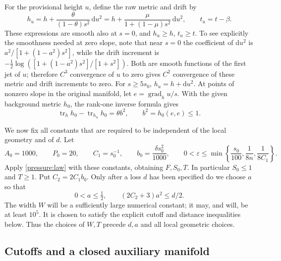\documentclass[11pt]{article}
\numberwithin{equation}{section}
\theoremstyle{definition}
\theoremstyle{remark}
\begin{document}
For the provisional height $u$, define the raw metric and drift by
\begin{equation}\label{step:raw-output}
 h_u=h+\frac{\theta}{(1-\theta)s^2}\,\mathrm d u^2
     =h+\frac{\mu}{1+(1-\mu)s^2}\,\mathrm d u^2,
 \qquad t_u=t-\beta.
\end{equation}
These expressions are smooth also at $s=0$, and $h_u\ge h$, $t_u\ge t$.
To see explicitly the smoothness needed at zero slope, note that near $s=0$
the coefficient of $\mathrm d u^2$ is
$a^2/[1+(1-a^2)s^2]$, while the drift increment is
$-\tfrac12\log([1+(1-a^2)s^2]/[1+s^2])$.
Both are smooth functions of the first jet of $u$; therefore
$C^3$ convergence of $u$ to zero gives $C^2$ convergence of these
metric and drift increments to zero.
For $s\ge5s_0$, $h_u=h+\mathrm d u^2$.  At points of nonzero slope in the original manifold, let
$e=\operatorname{grad}_hu/s$. With the given background metric $h_0$, the rank-one
inverse formula gives
\begin{equation}\label{step:trace}
 \operatorname{tr}_hh_0-\operatorname{tr}_{h_u}h_0=\theta b^2,
 \qquad b^2=h_0(e,e)\le1.
\end{equation}

We now fix all constants that are required to be independent of the local
geometry and of $d$.  Let
\begin{equation}\label{step:constants}
 A_0=1000,\qquad P_0=20,\qquad C_1=s_0^{-1},\qquad
 b_0=\frac{\delta s_0^2}{1000},\qquad
 0<\varepsilon\le\min\left\{\frac{s_0}{100},\frac1{8n},\frac1{8C_1}\right\}.
\end{equation}
Apply \cref{pressure:law} with these constants, obtaining $F,S_0,T$.
In particular $S_0\le1$ and $T\ge1$.  Put $C_2=2C_1b_0$.
Only after a loss $d$ has been specified do we choose $a$ so that
\begin{equation}\label{step:a-choice}
 0<a\le\tfrac12,\qquad (2C_2+3)a^2\le d/2.
\end{equation}
The width $W$ will be a sufficiently large numerical constant; it may,
and will, be at least $10^5$.  It is chosen to satisfy the explicit
cutoff and distance inequalities below.  Thus the choices of $W,T$
precede $d,a$ and all local geometric choices.

\subsection{Cutoffs and a closed auxiliary manifold}
\end{document}
